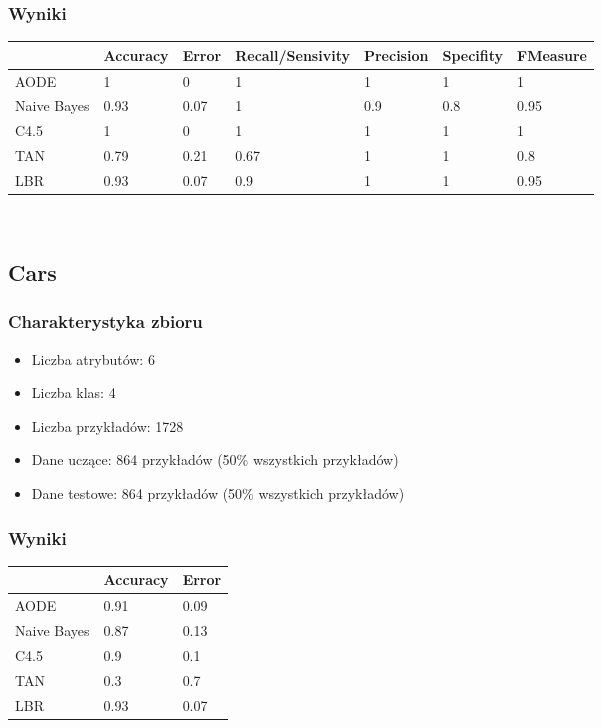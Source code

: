 \documentclass[16]{article}
\begin{document}
\subsubsection{Wyniki}
\begin{tabular}{ |l|l|l|l|l|l|l| }
\hline
&  Accuracy & Error & Recall/Sensivity & Precision & Specifity & FMeasure
\\ \hline
AODE & 1 & 0 & 1 & 1 & 1 & 1
\\ \hline
Naive Bayes & 0.93 & 0.07 & 1 & 0.9 & 0.8 & 0.95
\\ \hline
C4.5 & 1 & 0 & 1 & 1 & 1 & 1
\\ \hline
TAN & 0.79 & 0.21 & 0.67 & 1 & 1 & 0.8
\\ \hline
LBR & 0.93 & 0.07 & 0.9 & 1 & 1 & 0.95
\\ \hline
\end{tabular}\\

\subsection{Cars}
\subsubsection{Charakterystyka zbioru}
\begin{itemize}
	\item Liczba atrybutów: 6
	\item Liczba klas: 4
	\item Liczba przykładów: 1728
	\item Dane uczące: 864 przykładów (50\% wszystkich przykładów) 
	\item Dane testowe: 864 przykładów (50\% wszystkich przykładów)
\end{itemize}
\subsubsection{Wyniki}
\begin{tabular}{ |l|l|l| }
\hline
&  Accuracy & Error
\\ \hline
AODE & 0.91 & 0.09
\\ \hline
Naive Bayes & 0.87 & 0.13
\\ \hline
C4.5 & 0.9 & 0.1
\\ \hline
TAN & 0.3 & 0.7
\\ \hline
LBR & 0.93 & 0.07
\\ \hline
\end{tabular}\\
\end{document}
